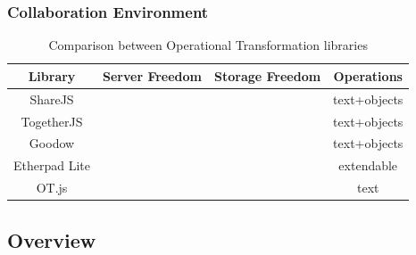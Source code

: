 \documentclass[compress]{beamer}
\newcommand{\cmark}{{\color{mygreen}\ding{51}}}%
\newcommand{\xmark}{{\color{red}\ding{55}}}%
\begin{document}
  		\begin{frame}[c]
		\frametitle{Collaboration Environment}

			\begin{table}
			\centering
			\caption{Comparison between Operational Transformation libraries}
			\label{table:otcomparision}
			\begin{tabular}{|c|c|c|c|}
			\hline
			\textbf{Library} & \textbf{Server Freedom} & \textbf{Storage Freedom} & \textbf{Operations} \\ \hline
			ShareJS          & \xmark                 & \xmark                  & text+objects        \\ \hline
			TogetherJS       & \xmark                 & \cmark                   & text+objects        \\ \hline
			Goodow           & \xmark                 & \xmark                  & text+objects        \\ \hline
			Etherpad Lite    & \xmark                 & \xmark                  & extendable 			    \\ \hline
			OT.js            & \cmark                  & \cmark                   & text                \\ \hline
			\end{tabular}
			\end{table}

		\end{frame}

	\subsection{Overview}
\end{document}
